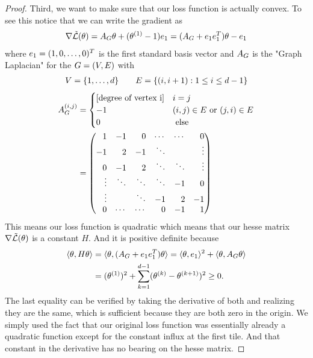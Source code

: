 \begin{proof}
	Third, we want to make sure that our loss function is actually convex. To
	see this notice that we can write the gradient as
	\begin{align}\label{eq: naive complexity example loss gradient}
		\nabla \tilde{\mathcal{L}}(\theta)
		= A_G\theta + (\theta^{(1)} -1) e_1
		= (A_G + e_1 e_1^T)\theta - e_1
	\end{align}
	where \(e_1=(1,0,\dots,0)^T\) is the first standard basis
	vector and \(A_G\) is the "Graph Laplacian" for the 
	 \(G=(V, E)\) with 
	\begin{align*}
		V = \{1,\dots, d\}
		\qquad
		E = \{(i, i+1) : 1\le i \le d-1\}
	\end{align*}
	\begin{align*}
		\graphLaplacian^{(i,j)} 
		&= 
		\begin{cases}
			[\text{degree of vertex i}] & i=j\\
			-1 & (i,j)\in\edges \text{ or } (j,i)\in\edges\\
			0 & \text{ else}
		\end{cases}
		\\
		&=
		\begin{pmatrix*}[r]
			1 & -1 & 0  & \cdots & \cdots & 0 \\
			-1 & 2 & -1 & \ddots &  &  \vdots \\ 
			0 & -1 & 2 & \ddots & \ddots & \vdots \\
			\vdots & \ddots & \ddots & \ddots & -1 & 0 \\
			\vdots &  & \ddots & -1 & 2 & -1 \\
			0 & \cdots & \cdots & 0  & -1 & 1
		\end{pmatrix*}
	\end{align*}
	This means our loss function is quadratic which means that our
	hesse matrix \(\nabla \tilde{\mathcal{L}}(\theta)\) is a constant \(H\). And it is
	positive definite because
	\begin{align*}
		\langle \theta , H \theta\rangle
		&= \langle \theta, (A_G + e_1 e_1^T) \theta \rangle
		= \langle \theta, e_1\rangle^2
		+ \langle \theta, A_G \theta\rangle
		\\
		&= (\theta^{(1)})^2
		+ \sum_{k=1}^{d-1}(\theta^{(k)}-\theta^{(k+1)})^2
		\ge 0.
	\end{align*}
	The last equality can be verified by taking the derivative of both and
	realizing they are the same, which is sufficient because they are both zero	
	in the origin. We simply used the fact that our original loss function
	was essentially already a quadratic function except for the constant influx
	at the first tile. And that constant in the derivative has no bearing on the
	hesse matrix.



\end{proof}

